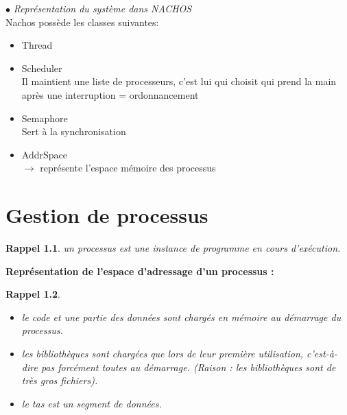 \documentclass[12pt,a4paper]{report}
\newtheorem*{rap}{Rappel}
\begin{document}
$\bullet$ \textit{Représentation du système dans NACHOS\\}
Nachos possède les classes suivantes:
\begin{itemize}
\item Thread
\item Scheduler\\
Il maintient une liste de processeurs, c'est lui qui choisit qui prend la main après une interruption = ordonnancement
\item Semaphore\\
Sert à la synchronisation
\item AddrSpace\\
$\rightarrow$ représente l'espace mémoire des processus
\end{itemize}


\chapter{Gestion de processus}

\begin{rap} un processus est une instance de programme en cours
 d'exécution. \end{rap}

\textbf{Représentation de l'espace d'adressage d'un processus :}
\begin{center}
\end{center}

\begin{rap}
\begin{itemize}
\item le code et une partie des données sont chargés en mémoire au démarrage du processus.
\item les bibliothèques sont chargées que lors de leur première utilisation, c'est-à-dire pas forcément toutes au démarrage. (Raison : les bibliothèques sont de très gros fichiers).
\item le tas est un segment de données.
\\
\end{itemize}
\end{rap}
\end{document}
